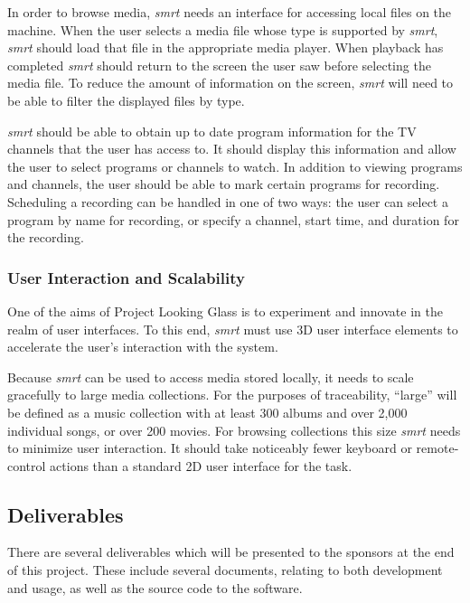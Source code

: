 \documentclass[letterpaper, titlepage, 11pt]{article}
\begin{document}
In order to browse media, \textit{smrt} needs an interface for accessing local
files on the machine. When the user selects a media file whose type is supported
by \textit{smrt}, \textit{smrt} should load that file in the appropriate media
player. When playback has completed \textit{smrt} should return to the screen
the user saw before selecting the media file. To reduce the amount of
information on the screen, \textit{smrt} will need to be able to filter the
displayed files by type.

\textit{smrt} should be able to obtain up to date program information for the TV
channels that the user has access to. It should display this information and
allow the user to select programs or channels to watch. In addition to viewing
programs and channels, the user should be able to mark certain programs for
recording. Scheduling a recording can be handled in one of two ways: the user
can select a program by name for recording, or specify a channel, start time,
and duration for the recording.

\subsubsection{User Interaction and Scalability}
One of the aims of Project Looking Glass is to experiment and innovate in
the realm of user interfaces.  To this end, \textit{smrt} must use 3D user
interface elements to accelerate the user's interaction with the system.

Because \textit{smrt} can be used to access media stored locally, it needs to
scale gracefully to large media collections. For the purposes of traceability,
``large'' will be defined as a music collection with at least 300 albums and
over 2,000 individual songs, or over 200 movies. For browsing collections this size
\textit{smrt} needs to minimize user interaction. It should take noticeably
fewer keyboard or remote-control actions than a standard 2D user interface for
the task.

\subsection {Deliverables}
There are several deliverables which will be presented to the sponsors at the
end of this project.  These include several documents, relating to both
development and usage, as well as the source code to the software.
\end{document}
